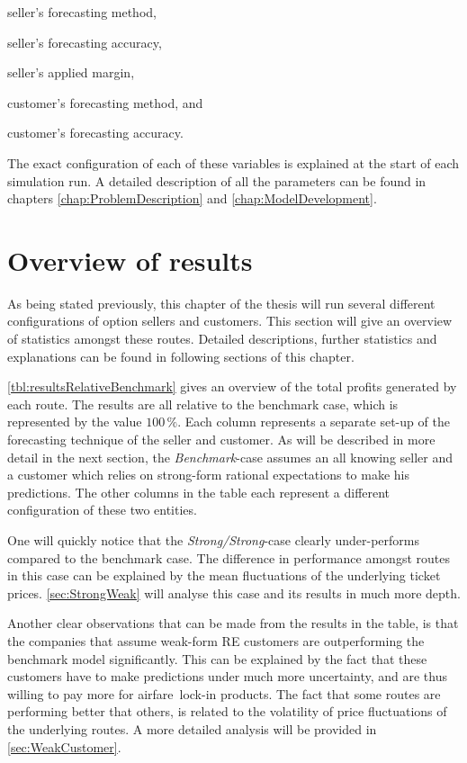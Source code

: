 \begin{compactitem}
    \item seller's forecasting method,
    \item seller's forecasting accuracy,
    \item seller's applied margin,
    \item customer's forecasting method, and
    \item customer's forecasting accuracy.
\end{compactitem}

The exact configuration of each of these variables is explained at the start of each simulation run. A detailed description of all the parameters can be found in chapters \autoref{chap:ProblemDescription} and \autoref{chap:ModelDevelopment}.


\section{Overview of results}
As being stated previously, this chapter of the thesis will run several different configurations of option sellers and customers. This section will give an overview of statistics amongst these routes. Detailed descriptions, further statistics and explanations can be found in following sections of this chapter.

\autoref{tbl:resultsRelativeBenchmark} gives an overview of the total profits generated by each route. The results are all relative to the benchmark case, which is represented by the value $100\,\%$. Each column represents a separate set-up of the forecasting technique of the seller and customer. As will be described in more detail in the next section, the \emph{Benchmark}-case assumes an all knowing seller and a customer which relies on strong-form rational expectations to make his predictions. The other columns in the table each represent a different configuration of these two entities.

One will quickly notice that the \emph{Strong/Strong}-case clearly under-performs compared to the benchmark case. The difference in performance amongst routes in this case can be explained by the mean fluctuations of the underlying ticket prices. \autoref{sec:StrongWeak} will analyse this case and its results in much more depth.

Another clear observations that can be made from the results in the table, is that the companies that assume weak-form RE customers are outperforming the benchmark model significantly. This can be explained by the fact that these customers have to make predictions under much more uncertainty, and are thus willing to pay more for airfare~lock-in products. The fact that some routes are performing better that others, is related to the volatility of price fluctuations of the underlying routes. A more detailed analysis will be provided in \autoref{sec:WeakCustomer}.

